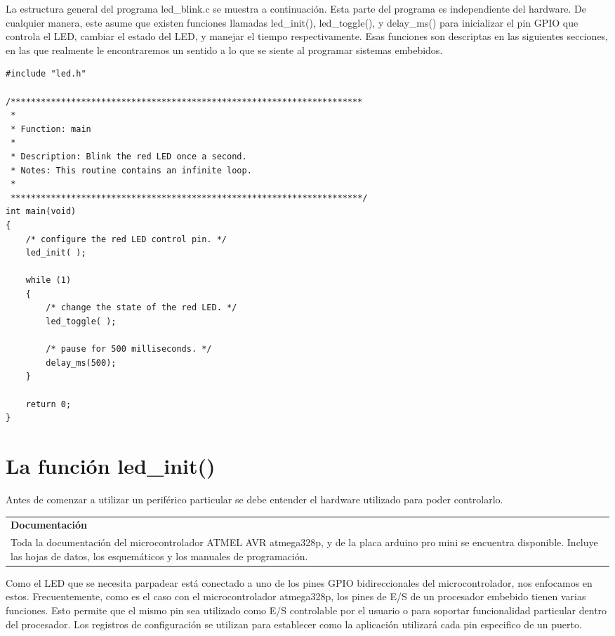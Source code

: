 \documentclass[output=paper, 
colorlinks,
citecolor=brown,
newtxmath
]{langscibook}
\begin{document}
La estructura general del programa led\_blink.c se muestra a continuación.
Esta parte del programa es independiente del hardware. De cualquier manera,
este asume que existen funciones llamadas led\_init(), led\_toggle(), y delay\_ms()
para inicializar el pin GPIO que controla el LED, cambiar el estado del LED,
y manejar el tiempo respectivamente. Esas funciones son descriptas en las 
siguientes secciones, en las que realmente le encontraremos un
sentido a lo que se siente al programar sistemas embebidos.

\begin{verbatim}
#include "led.h"

/**********************************************************************
 *
 * Function: main
 *
 * Description: Blink the red LED once a second.
 * Notes: This routine contains an infinite loop.
 *
 **********************************************************************/
int main(void)
{
    /* configure the red LED control pin. */
    led_init( );

    while (1)
    {
        /* change the state of the red LED. */
        led_toggle( );

        /* pause for 500 milliseconds. */
        delay_ms(500);
    }

    return 0;
}
\end{verbatim}

\section {La función led\_init()}

Antes de comenzar a utilizar un periférico particular se debe entender el 
hardware utilizado para poder controlarlo.

\begin{center}
\begin{tabularx}{\textwidth}{|X|}
\hline
\rowcolor{aliceblue}
\textbf{Documentación}\\
Toda la documentación del microcontrolador ATMEL AVR atmega328p, y 
de la placa arduino pro mini se encuentra disponible. Incluye las hojas de datos,
los esquemáticos y los manuales de programación.\\
\hline
\end{tabularx}
\end{center}





Como el LED que se necesita parpadear está conectado a uno de los pines
GPIO bidireccionales del microcontrolador, nos enfocamos en estos.
Frecuentemente, como es el caso con el microcontrolador atmega328p, los
pines de E/S de un procesador embebido tienen varias funciones.
Esto permite que el mismo pin sea utilizado como E/S controlable por el usuario
o para soportar funcionalidad particular dentro del procesador.
Los registros de configuración se utilizan para establecer como la aplicación
utilizará cada pin especifico de un puerto.
\end{document}
